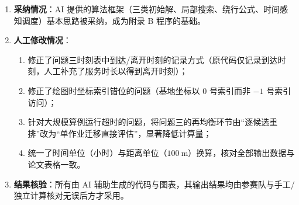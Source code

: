 \documentclass[12pt,a4paper]{ctexart}
\begin{document}
\begin{enumerate}
  \item \textbf{采纳情况}：AI 提供的算法框架（三类初始解、局部搜索、绕行公式、时间感知调度）基本思路被采纳，成为附录 B 程序的基础。
  \item \textbf{人工修改情况}：
  \begin{enumerate}
    \item 修正了问题三时刻表中到达/离开时刻的记录方式（原代码仅记录到达时刻，人工补充了服务时长以得到离开时刻）；
    \item 修正了绘图时坐标索引错位的问题（基地坐标以 0 号索引而非 $-1$ 号索引访问）；
    \item 针对大规模算例运行超时的问题，将问题三的再均衡环节由``逐候选重排''改为``单作业迁移直接评估''，显著降低计算量；
    \item 统一了时间单位（小时）与距离单位（$100\ \mathrm{m}$）换算，核对全部输出数据与论文表格一致。
  \end{enumerate}
  \item \textbf{结果核验}：所有由 AI 辅助生成的代码与图表，其输出结果均由参赛队与手工/独立计算核对无误后方才采用。
\end{enumerate}
\end{document}

